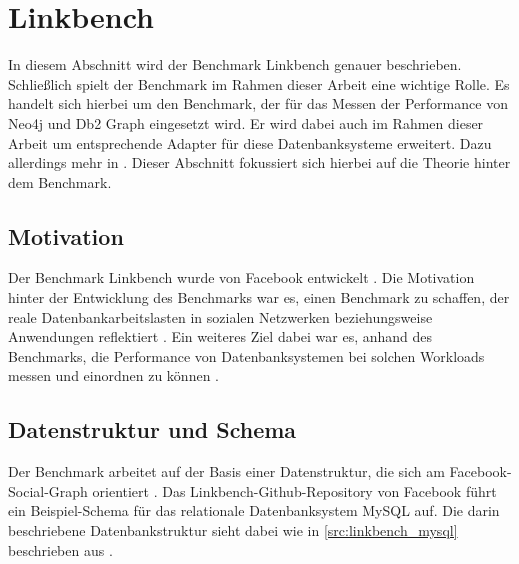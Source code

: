 \section{Linkbench}
\label{linkbench}
In diesem Abschnitt wird der Benchmark Linkbench genauer beschrieben. Schließlich spielt der Benchmark im Rahmen dieser Arbeit eine wichtige Rolle. Es handelt sich hierbei um den Benchmark, der für das Messen der Performance von Neo4j und Db2 Graph eingesetzt wird. Er wird dabei auch im Rahmen dieser Arbeit um entsprechende Adapter für diese Datenbanksysteme erweitert. Dazu allerdings mehr in . Dieser Abschnitt fokussiert sich hierbei auf die Theorie hinter dem Benchmark. 

\subsection{Motivation}
Der Benchmark Linkbench wurde von Facebook entwickelt \cite{linkbench_paper}. Die Motivation hinter der Entwicklung des Benchmarks war es, einen Benchmark zu schaffen, der reale Datenbankarbeitslasten in sozialen Netzwerken beziehungsweise Anwendungen reflektiert \cite{linkbench_paper}. Ein weiteres Ziel dabei war es, anhand des Benchmarks, die Performance von Datenbanksystemen bei solchen Workloads messen und einordnen zu können \cite{linkbench_paper}.

\subsection{Datenstruktur und Schema}
Der Benchmark arbeitet auf der Basis einer Datenstruktur, die sich am Facebook-Social-Graph orientiert \cite{linkbench_paper}. Das Linkbench-Github-Repository \cite{fb_linkbench_github} von Facebook führt ein Beispiel-Schema für das relationale Datenbanksystem MySQL auf. Die darin beschriebene Datenbankstruktur sieht dabei wie in \autoref{src:linkbench_mysql} beschrieben aus \cite{fb_linkbench_github}. 

